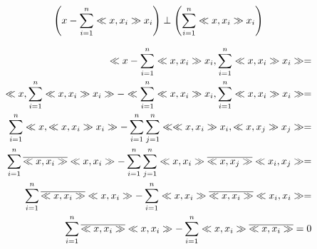 \begin{lema}
    \begin{equation}
        \left( x - \sum_{i=1}^n \ll x,x_i \gg x_i\right)
        \perp \left( \sum_{i=1}^n \ll x,x_i \gg x_i \right)
    \end{equation}
    \label{lema:bessel_prereq}
\end{lema}
\begin{dokaz}
    \begin{align}
        \ll  x - \sum_{i=1}^n \ll x,x_i \gg x_i, 
                \sum_{i=1}^n \ll x,x_i \gg x_i \gg = \\
        \ll x,\sum_{i=1}^n \ll x,x_i \gg x_i \gg -
        \ll \sum_{i=1}^n \ll x,x_i \gg x_i, 
                \sum_{i=1}^n \ll x,x_i \gg x_i \gg = \\
        \sum_{i=1}^n\ll x,\ll x,x_i \gg x_i \gg -
        \sum_{i=1}^n \sum_{j=1}^n
         \ll \ll x,x_i \gg x_i,\ll x,x_j \gg x_j \gg = \\
         \sum_{i=1}^n\overline{\ll x,x_i \gg}\ll x,x_i \gg -
        \sum_{i=1}^n \sum_{j=1}^n
         \ll x,x_i \gg\overline{\ll x,x_j \gg}\ll x_i,x_j \gg = \\         
        \sum_{i=1}^n\overline{\ll x,x_i \gg}\ll x,x_i \gg -
        \sum_{i=1}^n
         \ll x,x_i \gg\overline{\ll x,x_i \gg}\ll x_i,x_i \gg = \\
        \sum_{i=1}^n\overline{\ll x,x_i \gg}\ll x,x_i \gg -
        \sum_{i=1}^n
         \ll x,x_i \gg\overline{\ll x,x_i \gg} = 0
    \end{align}
\end{dokaz}

